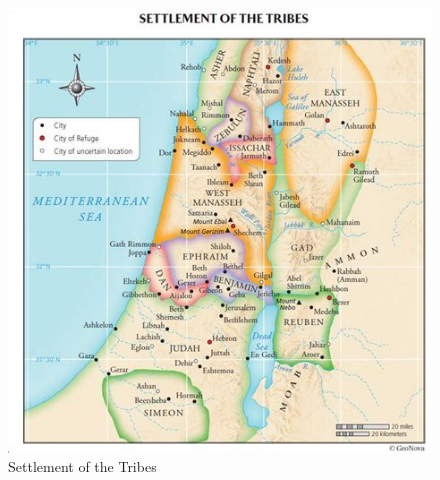 \newpage
\begin{figure}
\begin{center}
\includegraphics[scale=1, angle=0]{05OT-Deuteronomy/References/SettlementOfTheTribes.jpeg}
\caption[Settlement of the Tribes]{Settlement of the Tribes}
\label{fig:Settlement of the Tribes}
\end{center}
\end{figure}


